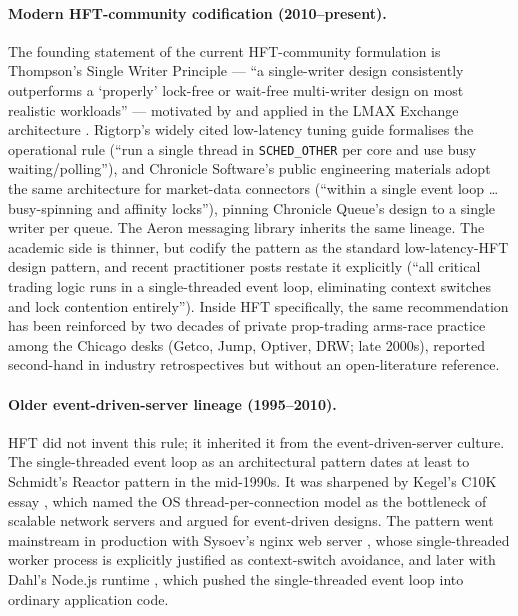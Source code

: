 \documentclass[11pt]{article}
\begin{document}
\paragraph{Modern HFT-community codification (2010--present).} The founding statement of
the current HFT-community formulation is Thompson's Single Writer Principle
\citep{thompson2011singlewriter} --- ``a single-writer design consistently outperforms a
`properly' lock-free or wait-free multi-writer design on most realistic workloads'' ---
motivated by and applied in the LMAX Exchange architecture
\citep{fowler2011lmax,lmaxdisruptor}. Rigtorp's widely cited low-latency tuning guide
\citep{rigtorp_lowlatency} formalises the operational rule (``run a single thread in
\texttt{SCHED\_OTHER} per core and use busy waiting/polling''), and Chronicle Software's
public engineering materials \citep{chronicle_fasttrading} adopt the same architecture for
market-data connectors (``within a single event loop \ldots busy-spinning and affinity
locks''), pinning Chronicle Queue's design to a single writer per queue. The Aeron
messaging library \citep{aeron} inherits the same lineage. The academic side is thinner,
but \citet{kwan2023hftpatterns} codify the pattern as the standard low-latency-HFT design
pattern, and recent practitioner posts \citep{hu2024sequencer} restate it explicitly
(``all critical trading logic runs in a single-threaded event loop, eliminating context
switches and lock contention entirely''). Inside HFT specifically, the same recommendation
has been reinforced by two decades of private prop-trading arms-race practice among the
Chicago desks (Getco, Jump, Optiver, DRW; late 2000s), reported second-hand in industry
retrospectives but without an open-literature reference.

\paragraph{Older event-driven-server lineage (1995--2010).} HFT did not invent this rule;
it inherited it from the event-driven-server culture. The single-threaded event loop as an
architectural pattern dates at least to Schmidt's Reactor pattern
\citep{schmidt1995reactor} in the mid-1990s. It was sharpened by Kegel's C10K essay
\citep{kegel1999c10k}, which named the OS thread-per-connection model as the bottleneck of
scalable network servers and argued for event-driven designs. The pattern went mainstream
in production with Sysoev's nginx web server \citep{sysoev2004nginx}, whose
single-threaded worker process is explicitly justified as context-switch avoidance, and
later with Dahl's Node.js runtime \citep{dahl2009nodejs}, which pushed the single-threaded
event loop into ordinary application code.
\end{document}
